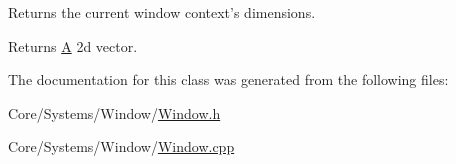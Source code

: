 Returns the current window context's dimensions. 

\begin{DoxyReturn}{Returns}
\hyperlink{classA}{A} 2d vector. 
\end{DoxyReturn}


The documentation for this class was generated from the following files\-:\begin{DoxyCompactItemize}
\item 
Core/\-Systems/\-Window/\hyperlink{Window_8h}{Window.\-h}\item 
Core/\-Systems/\-Window/\hyperlink{Window_8cpp}{Window.\-cpp}\end{DoxyCompactItemize}
